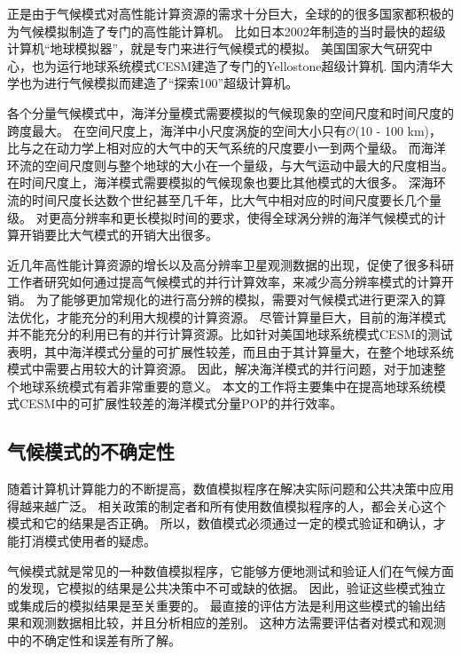 正是由于气候模式对高性能计算资源的需求十分巨大，全球的的很多国家都积极的为气候模拟制造了专门的高性能计算机。 比如日本2002年制造的当时最快的超级计算机“地球模拟器”，就是专门来进行气候模式的模拟\cite{habata2003earth}。
美国国家大气研究中心，也为运行地球系统模式CESM建造了专门的Yellostone超级计算机\cite{loft:2015}. 
国内清华大学也为进行气候模拟而建造了“探索100”超级计算机。

各个分量气候模式中，海洋分量模式需要模拟的气候现象的空间尺度和时间尺度的跨度最大。 
在空间尺度上，海洋中小尺度涡旋的空间大小只有$\mathcal{O}$(10 - 100 km)， 比与之在动力学上相对应的大气中的天气系统的尺度要小一到两个量级。
而海洋环流的空间尺度则与整个地球的大小在一个量级，与大气运动中最大的尺度相当。
在时间尺度上，海洋模式需要模拟的气候现象也要比其他模式的大很多。 深海环流的时间尺度长达数个世纪甚至几千年，比大气中相对应的时间尺度要长几个量级。
对更高分辨率和更长模拟时间的要求，使得全球涡分辨的海洋气候模式的计算开销要比大气模式的开销大出很多\cite{bryan2010frontal,mcclean2011prototype,graham2014importance}。

近几年高性能计算资源的增长以及高分辨率卫星观测数据的出现，促使了很多科研工作者研究如何通过提高气候模式的并行计算效率，来减少高分辨率模式的计算开销。
为了能够更加常规化的进行高分辨的模拟，需要对气候模式进行更深入的算法优化，才能充分的利用大规模的计算资源。
尽管计算量巨大，目前的海洋模式并不能充分的利用已有的并行计算资源。比如针对美国地球系统模式CESM的测试表明，其中海洋模式分量的可扩展性较差，而且由于其计算量大，在整个地球系统模式中需要占用较大的计算资源。
因此，解决海洋模式的并行问题，对于加速整个地球系统模式有着非常重要的意义。
本文的工作将主要集中在提高地球系统模式CESM中的可扩展性较差的海洋模式分量POP的并行效率。  
 

\subsection{气候模式的不确定性}
随着计算机计算能力的不断提高，数值模拟程序在解决实际问题和公共决策中应用得越来越广泛。 
相关政策的制定者和所有使用数值模拟程序的人，都会关心这个模式和它的结果是否正确。
所以，数值模式必须通过一定的模式验证和确认，才能打消模式使用者的疑虑\cite{whitner1989guidelines,stainforth2005uncertainty}。

气候模式就是常见的一种数值模拟程序，它能够方便地测试和验证人们在气候方面的发现，它模拟的结果是公共决策中不可或缺的依据\cite{allen2002towards,reynolds1994random}。
因此，验证这些模式独立或集成后的模拟结果是至关重要的。
最直接的评估方法是利用这些模式的输出结果和观测数据相比较，并且分析相应的差别。 
这种方法需要评估者对模式和观测中的不确定性和误差有所了解。 

